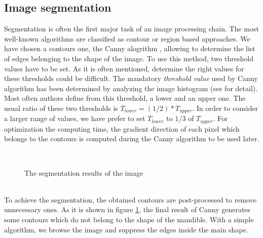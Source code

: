\documentclass[twoside,twocolumn,10pt]{article}
\begin{document}
\subsection{Image segmentation}
Segmentation is often the first major task of an image processing
chain. The most well-known algorithms are classified as contour
or region based approaches. We have chosen a contours one, the
Canny alogrithm \cite{canny1986computational}, allowing to determine the 
list of edges belonging to the shape of the image.
To use this method, two threshold values have to be set. As it is often mentioned, determine the right values for these thresholds could be difficult\cite{adaptiveCanny}. The mandatory \textit{threshold
  value} used by Canny algorithm has been determined by analyzing the image
histogram (see \cite{leestimating} for detail). Most often authors define from this threshold, a lower and an upper one. The usual ratio of these two thresholds is $T_{lower} = (1/2) * T_{upper}$. In order to consider a larger range of values, we have prefer to set $T_{lower}$ to $1/3$ of $T_{upper}$. For optimization the computing time, the gradient direction of each pixel which belongs to the contours is computed during the Canny algorithm to be used later.\\
\begin{figure}[h]
\centering
{}~~ 
\caption{The segmentation results of the image}
\label{canny}
\end{figure}~\\
To achieve the segmentation, the obtained contours are post-processed to remove unnecessary
ones. As it is shown in figure \ref{canny}, the final result of Canny generates some contours which do not belong to the shape of the mandible. With a simple algorithm, we browse the image and suppress the edges inside the main shape.
\end{document}
